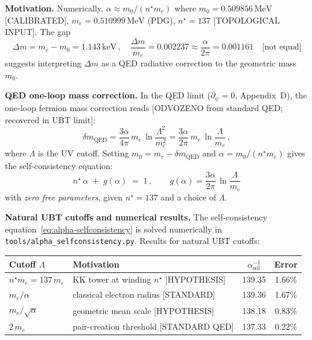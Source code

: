 \medskip
\noindent\textbf{Motivation.}
Numerically, $\alpha \approx m_0/(n^\star m_e)$ where $m_0=0.509856\,\text{MeV}$ [CALIBRATED],
$m_e=0.510999\,\text{MeV}$ (PDG), $n^\star=137$ [TOPOLOGICAL INPUT]. The gap
\begin{equation}
  \Delta m = m_e - m_0 = 1.143\,\text{keV}\,,\quad
  \frac{\Delta m}{m_e} = 0.002237 \approx \frac{\alpha}{2\pi}=0.001161
  \quad\text{[not equal]}
\end{equation}
suggests interpreting $\Delta m$ as a QED radiative correction to the geometric mass $m_0$.

\medskip
\noindent\textbf{QED one-loop mass correction.}
In the QED limit ($\partial_\psi=0$, Appendix~D), the one-loop fermion mass correction reads [ODVOZENO from standard QED; recovered in UBT limit]:
\begin{equation}
  \delta m_{\text{QED}} = \frac{3\alpha}{4\pi}\,m_e\,\ln\!\frac{\Lambda^2}{m_e^2}
  = \frac{3\alpha}{2\pi}\,m_e\,\ln\!\frac{\Lambda}{m_e}\,,
  \label{eq:QED-mass-correction}
\end{equation}
where $\Lambda$ is the UV cutoff.  Setting $m_0 = m_e - \delta m_{\text{QED}}$ and $\alpha = m_0/(n^\star m_e)$ gives the self-consistency equation:
\begin{equation}
  \boxed{n^\star\,\alpha \;+\; g(\alpha) \;=\; 1\,,
  \qquad g(\alpha) = \frac{3\alpha}{2\pi}\,\ln\!\frac{\Lambda}{m_e}}
  \label{eq:alpha-selfconsistency}
\end{equation}
with \emph{zero free parameters}, given $n^\star=137$ and a choice of $\Lambda$.

\medskip
\noindent\textbf{Natural UBT cutoffs and numerical results.}
The self-consistency equation~\eqref{eq:alpha-selfconsistency} is solved numerically in \texttt{tools/alpha\_selfconsistency.py}. Results for natural UBT cutoffs:

\begin{center}
\begin{tabular}{|l|l|c|c|}
\hline
\textbf{Cutoff} $\Lambda$ & \textbf{Motivation} & $\alpha^{-1}_\text{sol}$ & \textbf{Error} \\
\hline
$n^\star m_e = 137\,m_e$ & KK tower at winding $n^\star$ [HYPOTHESIS] & 139.35 & 1.66\% \\
$m_e/\alpha$             & classical electron radius [STANDARD]        & 139.36 & 1.67\% \\
$m_e/\sqrt{\alpha}$      & geometric mean scale [HYPOTHESIS]           & 138.18 & 0.83\% \\
$2\,m_e$                 & pair-creation threshold [STANDARD QED]      & 137.33 & 0.22\% \\
\hline
\end{tabular}
\end{center}

